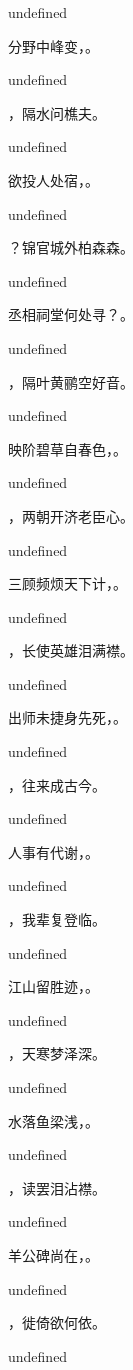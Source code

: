 \documentclass[12pt, a4paper, addpoints]{exam}
\begin{document}
\begin{questions}
undefined

\question[3] 分野中峰变，\fillin。

undefined

\question[3] \fillin，隔水问樵夫。

undefined

\question[3] 欲投人处宿，\fillin。

undefined

\question[3] \fillin？锦官城外柏森森。

undefined

\question[3] 丞相祠堂何处寻？\fillin。

undefined

\question[3] \fillin，隔叶黄鹂空好音。

undefined

\question[3] 映阶碧草自春色，\fillin。

undefined

\question[3] \fillin，两朝开济老臣心。

undefined

\question[3] 三顾频烦天下计，\fillin。

undefined

\question[3] \fillin，长使英雄泪满襟。

undefined

\question[3] 出师未捷身先死，\fillin。

undefined

\question[3] \fillin，往来成古今。

undefined

\question[3] 人事有代谢，\fillin。

undefined

\question[3] \fillin，我辈复登临。

undefined

\question[3] 江山留胜迹，\fillin。

undefined

\question[3] \fillin，天寒梦泽深。

undefined

\question[3] 水落鱼梁浅，\fillin。

undefined

\question[3] \fillin，读罢泪沾襟。

undefined

\question[3] 羊公碑尚在，\fillin。

undefined

\question[3] \fillin，徙倚欲何依。

undefined


\end{questions}
\end{document}
